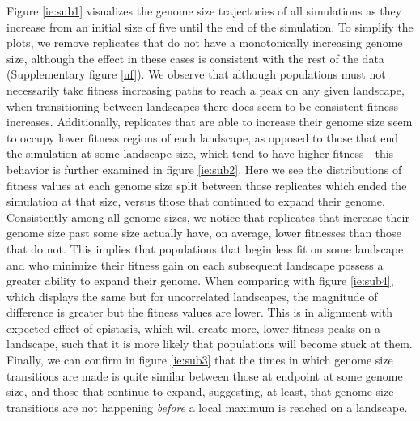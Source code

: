 \documentclass[paper=a4, fontsize=11pt,twoside]{scrartcl}       %
\begin{document}
Figure \ref{ie:sub1} visualizes the genome size trajectories of all simulations as they increase from an initial size of five until the end of the simulation. To simplify the plots, we remove replicates that do not have a monotonically increasing genome size, although the effect in these cases is consistent with the rest of the data (Supplementary figure \ref{uf}). We observe that although populations must not necessarily take fitness increasing paths to reach a peak on any given landscape, when transitioning between landscapes there does seem to be consistent fitness increases. Additionally, replicates that are able to increase their genome size seem to occupy lower fitness regions of each landscape, as opposed to those that end the simulation at some landscape size, which tend to have higher fitness - this behavior is further examined in figure \ref{ie:sub2}. Here we see the distributions of fitness values at each genome size split between those replicates which ended the simulation at that size, versus those that continued to expand their genome. Consistently among all genome sizes, we notice that replicates that increase their genome size past some size actually have, on average, lower fitnesses than those that do not. This implies that populations that begin less fit on some landscape and who minimize their fitness gain on each subsequent landscape possess a greater ability to expand their genome. When comparing with figure \ref{ie:sub4}, which displays the same but for uncorrelated landscapes, the magnitude of difference is greater but the fitness values are lower. This is in alignment with expected effect of epistasis, which will create more, lower fitness peaks on a landscape, such that it is more likely that populations will become stuck at them. Finally, we can confirm in figure \ref{ie:sub3} that the times in which genome size transitions are made is quite similar between those at endpoint at some genome size, and those that continue to expand, suggesting, at least, that genome size transitions are not happening \textit{before} a local maximum is reached on a landscape. 
\end{document}
